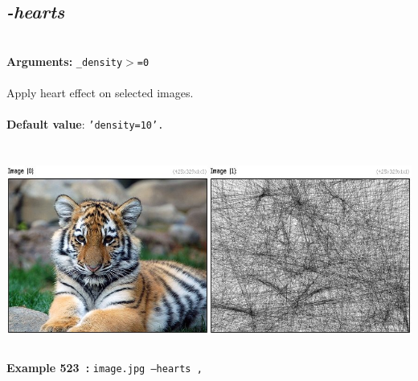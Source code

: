 \documentclass[a4paper,11pt,twoside]{book}
\begin{document}
\subsection{\emph{-hearts} }\vspace*{-0.5em}
~\\\textbf{Arguments: } 
{\small \texttt{\_density$>$=0}}\\~\\
Apply heart effect on selected images.
~\\~\\\textbf{Default value}: {\small \texttt{'density=10'.}}
\begin{center}\includegraphics[keepaspectratio=true,height=7cm,width=\textwidth]{img/gmic_def523.jpg}\\
{\footnotesize \textbf{Example 523~:} \texttt{image.jpg --hearts ,}}
\end{center}
\end{document}
